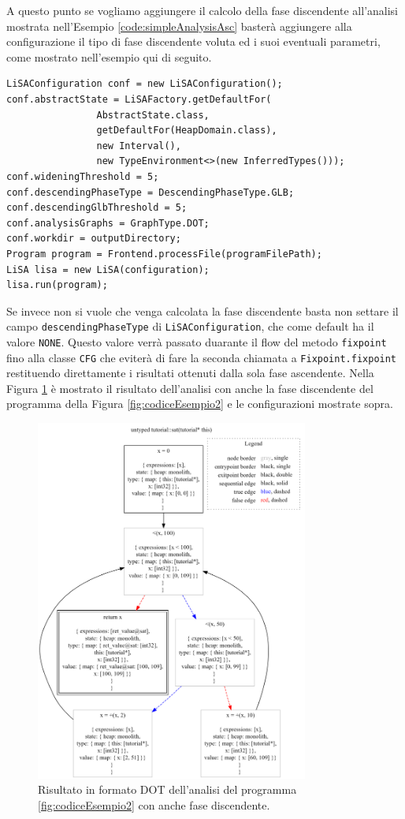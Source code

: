 A questo punto se vogliamo aggiungere il calcolo della fase discendente all'analisi mostrata nell'Esempio \ref{code:simpleAnalysisAsc} basterà aggiungere alla configurazione il tipo di fase discendente voluta ed i suoi eventuali parametri, come mostrato nell'esempio qui di seguito. 
\label{code:analisiDescending}
\begin{lstlisting}[belowskip=-1.1 \baselineskip]
LiSAConfiguration conf = new LiSAConfiguration();
conf.abstractState = LiSAFactory.getDefaultFor(
				AbstractState.class, 
				getDefaultFor(HeapDomain.class), 
				new Interval(),
				new TypeEnvironment<>(new InferredTypes()));
conf.wideningThreshold = 5;
conf.descendingPhaseType = DescendingPhaseType.GLB;
conf.descendingGlbThreshold = 5;
conf.analysisGraphs = GraphType.DOT;
conf.workdir = outputDirectory;
Program program = Frontend.processFile(programFilePath);
LiSA lisa = new LiSA(configuration);
lisa.run(program);
\end{lstlisting}
Se invece non si vuole che venga calcolata la fase discendente basta non settare il campo \texttt{descendingPhaseType} di \texttt{LiSAConfiguration}, che come default ha il valore \texttt{NONE}. Questo valore verrà passato duarante il flow del metodo \texttt{fixpoint} fino alla classe \texttt{CFG} che eviterà di fare la seconda chiamata a \texttt{Fixpoint.fixpoint} restituendo direttamente i risultati ottenuti dalla sola fase ascendente. Nella Figura \ref{fig:risultatoDOTDesc} è mostrato il risultato dell'analisi con anche la fase discendente del programma della Figura \ref{fig:codiceEsempio2} e le configurazioni mostrate sopra.
\begin{figure}[ht]
	\centering
	\includegraphics[width=0.8\textwidth]{Immagini/graphvizDesc.png}
	\caption{Risultato in formato DOT dell'analisi del programma \ref{fig:codiceEsempio2} con anche fase discendente.}
	\label{fig:risultatoDOTDesc}
\end{figure}

